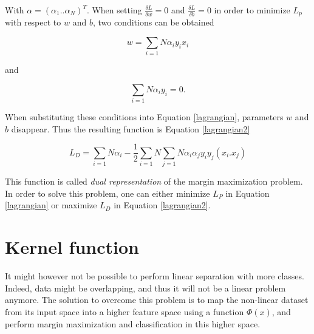 \noindent With $\alpha = (\alpha_1..\alpha_N)^T$. When setting $\frac{\delta L}{\delta w} = 0$ and $\frac{\delta L}{\delta b} = 0$ in order to minimize $L_p$ with respect to $w$ and $b$, two conditions can be obtained
\newline

\begin{equation}
w = \sum\limits_{i=1}\limits{N} \alpha_i y_i x_i
\end{equation}

and

\begin{equation}
\sum\limits_{i=1}\limits{N} \alpha_i y_i = 0.
\end{equation}
\vspace{\baselineskip}

\noindent When substituting these conditions into Equation \ref{lagrangian}, parameters $w$ and $b$ disappear. Thus the resulting function is Equation \ref{lagrangian2}
\newline

\begin{equation}
L_D = \sum\limits_{i=1}\limits{N} \alpha_i - \frac{1}{2} \sum\limits_{i=1}\limits{N} \sum\limits_{j=1}\limits{N} \alpha_i \alpha_j y_i y_j(x_i.x_j)
\label{lagrangian2}
\end{equation}
\vspace{\baselineskip}

\noindent This function is called \textit{dual representation} of the margin maximization problem. In order to solve this problem, one can either minimize $L_P$ in Equation \ref{lagrangian} or maximize $L_D$ in Equation \ref{lagrangian2}.
\newline

\section{Kernel function}
\label{kernel_fct}

\vspace{\baselineskip}
\noindent It might however not be possible to perform linear separation with more classes. Indeed, data might be overlapping, and thus it will not be a linear problem anymore. The solution to overcome this problem is to map the non-linear dataset from its input space into a higher feature space using a function $\Phi(x)$, and perform margin maximization and classification in this higher space. 
\newline

